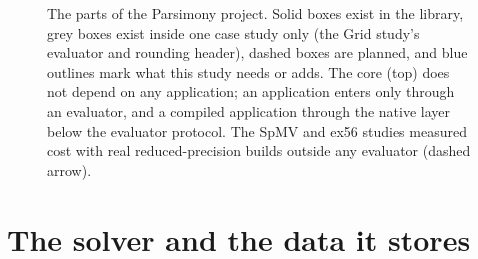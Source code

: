 \documentclass[11pt]{article}
\newif\ifplanning
\begin{document}
\begin{figure}[tbp]
  \caption{The parts of the Parsimony project.  Solid boxes exist in the library, grey boxes
    exist inside one case study only (the Grid study's evaluator and rounding header), dashed
    boxes are planned, and blue outlines mark what this study needs or adds\ifplanning; the labels P0 to P8
    are the items of Appendix~\ref{app:plan}\fi.  The core (top) does not depend on any
    application; an application enters only through an evaluator, and a compiled application
    through the native layer below the evaluator protocol.  The SpMV and ex56 studies measured
    cost with real reduced-precision builds outside any evaluator (dashed arrow).}
  \label{fig:shape}
\end{figure}

\section{The solver and the data it stores}
\label{sec:solver}
\end{document}
